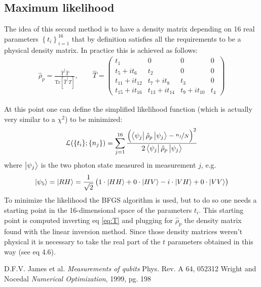 \documentclass[a4paper, 11pt]{article}
\begin{document}
    \subsection{Maximum likelihood}
      The idea of this second method is to have a density matrix depending on 16 real parameters $\left\{t_i \right\}_{i=1}^{16}$ that by definition satisfies all the requirements to be a physical density matrix. In practice this is achieved as follows:
      \begin{gather} \label{eq:T}
        \hat{\rho}_p = \frac{\hat{T}^\dagger \hat{T}}{\text{Tr}[\hat{T}^\dagger \hat{T}]}, \qquad
        \hat{T} =
        \begin{pmatrix}
          t_1 & 0 & 0 & 0 \\
          t_5 + it_6 & t_2 & 0 & 0 \\
          t_{11} + it_{12} & t_7 + it_8 & t_3 & 0 \\
          t_{15} + it_{16} & t_{13} + it_{14} & t_9 + it_{10} & t_4
        \end{pmatrix}
      \end{gather}

      At this point one can define the simplified likelihood function (which is actually very similar to a $\chi^2$) to be minimized:
      \begin{equation*}
        \mathcal{L}(\{t_i\}; \{n_j\}) = \sum_{j=1}^{16} \frac{\left(\bra{\psi_j}\hat{\rho}_p \ket{\psi_j} - \frac[f]{n_j}{N} \right)^2 }{2\bra{\psi_j}\hat{\rho}_p \ket{\psi_j}}
      \end{equation*}
      where $\ket{\psi_j}$ is the two photon state measured in measurement $j$, e.g.
      \begin{equation*}
        \ket{\psi_5} = \ket{RH} = \frac{1}{\sqrt{2}} \left(1\cdot\ket{HH} + 0\cdot\ket{HV} -i\cdot\ket{VH} +0\cdot\ket{VV} \right)
      \end{equation*}
      To minimize the likelihood the BFGS algorithm \cite{rif:bfgs} is used, but to do so one needs a starting point in the 16-dimensional space of the parameters $t_i$. This starting point is computed inverting eq \ref{eq:T} and plugging for $\hat{\rho}_p$ the density matrix found with the linear inversion method. Since those density matrices weren't physical it is necessary to take the real part of the $t$ parameters obtained in this way (see \cite{rif:tomo} eq 4.6).












  \begin{thebibliography}{100}
     D.F.V. James et al. \emph{Measurements of qubits} Phys. Rev. A 64, 052312
     Wright and Nocedal \emph{Numerical Optimization}, 1999, pg. 198
  \end{thebibliography}
\end{document}
